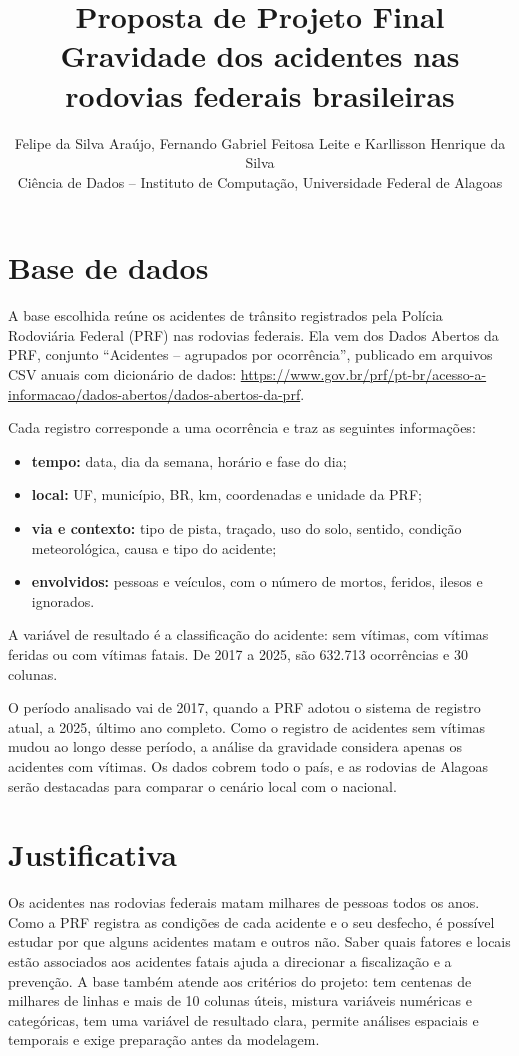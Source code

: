 \documentclass[11pt,a4paper]{article}
\title{\vspace{-1.5cm}Proposta de Projeto Final\\[2pt]
  \large Gravidade dos acidentes nas rodovias federais brasileiras}
\author{\normalsize Felipe da Silva Araújo, Fernando Gabriel Feitosa Leite e Karllisson Henrique da Silva\\[2pt]
  \normalsize Ciência de Dados -- Instituto de Computação, Universidade Federal de Alagoas}
\date{\vspace{-0.6cm}}
\begin{document}
\maketitle

\section*{Base de dados}

A base escolhida reúne os acidentes de trânsito registrados pela Polícia Rodoviária Federal (PRF) nas rodovias federais. Ela vem dos Dados Abertos da PRF, conjunto ``Acidentes -- agrupados por ocorrência'', publicado em arquivos CSV anuais com dicionário de dados: \url{https://www.gov.br/prf/pt-br/acesso-a-informacao/dados-abertos/dados-abertos-da-prf}.

Cada registro corresponde a uma ocorrência e traz as seguintes informações:
\begin{itemize}
  \item \textbf{tempo:} data, dia da semana, horário e fase do dia;
  \item \textbf{local:} UF, município, BR, km, coordenadas e unidade da PRF;
  \item \textbf{via e contexto:} tipo de pista, traçado, uso do solo, sentido, condição meteorológica, causa e tipo do acidente;
  \item \textbf{envolvidos:} pessoas e veículos, com o número de mortos, feridos, ilesos e ignorados.
\end{itemize}
A variável de resultado é a classificação do acidente: sem vítimas, com vítimas feridas ou com vítimas fatais. De 2017 a 2025, são 632.713 ocorrências e 30 colunas.

O período analisado vai de 2017, quando a PRF adotou o sistema de registro atual, a 2025, último ano completo. Como o registro de acidentes sem vítimas mudou ao longo desse período, a análise da gravidade considera apenas os acidentes com vítimas. Os dados cobrem todo o país, e as rodovias de Alagoas serão destacadas para comparar o cenário local com o nacional.

\section*{Justificativa}

Os acidentes nas rodovias federais matam milhares de pessoas todos os anos. Como a PRF registra as condições de cada acidente e o seu desfecho, é possível estudar por que alguns acidentes matam e outros não. Saber quais fatores e locais estão associados aos acidentes fatais ajuda a direcionar a fiscalização e a prevenção. A base também atende aos critérios do projeto: tem centenas de milhares de linhas e mais de 10 colunas úteis, mistura variáveis numéricas e categóricas, tem uma variável de resultado clara, permite análises espaciais e temporais e exige preparação antes da modelagem.
\end{document}
